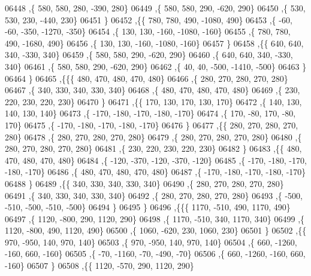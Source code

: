 \begin{DoxyCode}
06448     ,\{   580,   580,   280,  -390,   280\}
06449     ,\{   580,   580,   290,  -620,   290\}
06450     ,\{   530,   530,   230,  -440,   230\}
06451     \}
06452    ,\{\{   780,   780,   490, -1080,   490\}
06453     ,\{   -60,   -60,  -350, -1270,  -350\}
06454     ,\{   130,   130,  -160, -1080,  -160\}
06455     ,\{   780,   780,   490, -1680,   490\}
06456     ,\{   130,   130,  -160, -1080,  -160\}
06457     \}
06458    ,\{\{   640,   640,   340,  -330,   340\}
06459     ,\{   580,   580,   290,  -620,   290\}
06460     ,\{   640,   640,   340,  -330,   340\}
06461     ,\{   580,   580,   290,  -620,   290\}
06462     ,\{    40,    40,  -500, -1410,  -500\}
06463     \}
06464    \}
06465   ,\{\{\{   480,   470,   480,   470,   480\}
06466     ,\{   280,   270,   280,   270,   280\}
06467     ,\{   340,   330,   340,   330,   340\}
06468     ,\{   480,   470,   480,   470,   480\}
06469     ,\{   230,   220,   230,   220,   230\}
06470     \}
06471    ,\{\{   170,   130,   170,   130,   170\}
06472     ,\{   140,   130,   140,   130,   140\}
06473     ,\{  -170,  -180,  -170,  -180,  -170\}
06474     ,\{   170,   -80,   170,   -80,   170\}
06475     ,\{  -170,  -180,  -170,  -180,  -170\}
06476     \}
06477    ,\{\{   280,   270,   280,   270,   280\}
06478     ,\{   280,   270,   280,   270,   280\}
06479     ,\{   280,   270,   280,   270,   280\}
06480     ,\{   280,   270,   280,   270,   280\}
06481     ,\{   230,   220,   230,   220,   230\}
06482     \}
06483    ,\{\{   480,   470,   480,   470,   480\}
06484     ,\{  -120,  -370,  -120,  -370,  -120\}
06485     ,\{  -170,  -180,  -170,  -180,  -170\}
06486     ,\{   480,   470,   480,   470,   480\}
06487     ,\{  -170,  -180,  -170,  -180,  -170\}
06488     \}
06489    ,\{\{   340,   330,   340,   330,   340\}
06490     ,\{   280,   270,   280,   270,   280\}
06491     ,\{   340,   330,   340,   330,   340\}
06492     ,\{   280,   270,   280,   270,   280\}
06493     ,\{  -500,  -510,  -500,  -510,  -500\}
06494     \}
06495    \}
06496   ,\{\{\{  1170,  -510,   490,  1170,   490\}
06497     ,\{  1120,  -800,   290,  1120,   290\}
06498     ,\{  1170,  -510,   340,  1170,   340\}
06499     ,\{  1120,  -800,   490,  1120,   490\}
06500     ,\{  1060,  -620,   230,  1060,   230\}
06501     \}
06502    ,\{\{   970,  -950,   140,   970,   140\}
06503     ,\{   970,  -950,   140,   970,   140\}
06504     ,\{   660, -1260,  -160,   660,  -160\}
06505     ,\{   -70, -1160,   -70,  -490,   -70\}
06506     ,\{   660, -1260,  -160,   660,  -160\}
06507     \}
06508    ,\{\{  1120,  -570,   290,  1120,   290\}

\end{DoxyCode}
